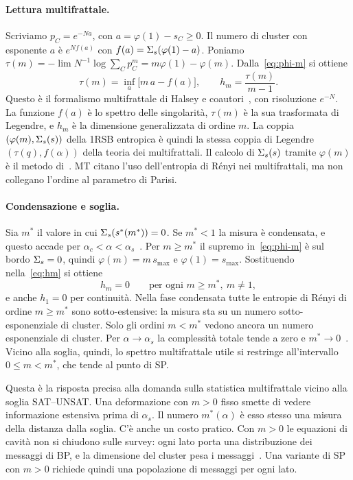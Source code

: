 \paragraph{Lettura multifrattale.}
Scriviamo $p_C=e^{-Na}$, con $a=\varphi(1)-s_C\ge0$.
Il numero di cluster con esponente $a$ è $e^{Nf(a)}$ con $f(a)=\Sigma_s(\varphi(1)-a)$.
Poniamo $\tau(m)=-\lim N^{-1}\log\sum_Cp_C^m=m\varphi(1)-\varphi(m)$.
Dalla~\eqref{eq:phi-m} si ottiene
\begin{equation}
\tau(m)=\inf_{a}\bigl[m\,a-f(a)\bigr],\qquad h_m=\frac{\tau(m)}{m-1}.
\label{eq:multifractal}
\end{equation}
Questo è il formalismo multifrattale di Halsey e coautori~\citep{halsey1986fractal}, con risoluzione $e^{-N}$.
La funzione $f(a)$ è lo spettro delle singolarità, $\tau(m)$ è la sua trasformata di Legendre, e $h_m$ è la dimensione generalizzata di ordine $m$.
La coppia $(\varphi(m),\Sigma_s(s))$ della 1RSB entropica è quindi la stessa coppia di Legendre $(\tau(q),f(\alpha))$ della teoria dei multifrattali.
Il calcolo di $\Sigma_s(s)$ tramite $\varphi(m)$ è il metodo di~\citep{mezard2005landscape,krzakala2007clusters}.
MT citano l'uso dell'entropia di Rényi nei multifrattali, ma non collegano l'ordine al parametro di Parisi.

\paragraph{Condensazione e soglia.}
Sia $m^*$ il valore in cui $\Sigma_s(s^*(m^*))=0$.
Se $m^*<1$ la misura è condensata, e questo accade per $\alpha_c<\alpha<\alpha_s$~\citep{krzakala2007clusters}.
Per $m\ge m^*$ il supremo in~\eqref{eq:phi-m} è sul bordo $\Sigma_s=0$, quindi $\varphi(m)=m\,s_{\max}$ e $\varphi(1)=s_{\max}$.
Sostituendo nella~\eqref{eq:hm} si ottiene
\begin{equation}
h_m=0\qquad\text{per ogni }m\ge m^*,\ m\ne1,
\label{eq:hm-zero}
\end{equation}
e anche $h_1=0$ per continuità.
Nella fase condensata tutte le entropie di Rényi di ordine $m\ge m^*$ sono sotto-estensive: la misura sta su un numero sotto-esponenziale di cluster.
Solo gli ordini $m<m^*$ vedono ancora un numero esponenziale di cluster.
Per $\alpha\to\alpha_s$ la complessità totale tende a zero e $m^*\to0$~\citep{krzakala2007clusters}.
Vicino alla soglia, quindi, lo spettro multifrattale utile si restringe all'intervallo $0\le m<m^*$, che tende al punto di SP.

Questa è la risposta precisa alla domanda sulla statistica multifrattale vicino alla soglia SAT--UNSAT.
Una deformazione con $m>0$ fisso smette di vedere informazione estensiva prima di $\alpha_s$.
Il numero $m^*(\alpha)$ è esso stesso una misura della distanza dalla soglia.
C'è anche un costo pratico.
Con $m>0$ le equazioni di cavità non si chiudono sulle survey: ogni lato porta una distribuzione dei messaggi di BP, e la dimensione del cluster pesa i messaggi~\citep{mezard2005landscape,krzakala2007clusters,mezard2009information}.
Una variante di SP con $m>0$ richiede quindi una popolazione di messaggi per ogni lato.

